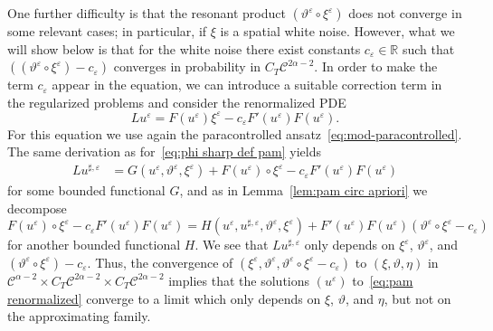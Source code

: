 \documentclass[a4paper,11pt]{article}
\theoremstyle{remark}
\newcommand{\CC}{\ensuremath{\mathscr{C}}}
\newcommand{\reso}{\,\mathord{\circ}\,}
\begin{document}
One further difficulty is that the resonant product $(\vartheta^{\varepsilon} \reso \xi^{\varepsilon} )$ does not converge in some
relevant cases; in particular, if $\xi$ is a spatial white noise. However, what we will show below is that for the white noise  there
exist constants $c_{\varepsilon} \in \mathbb{R}$ such that $((\vartheta^{\varepsilon} \reso \xi^{\varepsilon} ) -c_{\varepsilon})$ converges in probability
in $C_{T} \CC^{2 \alpha -2}$. In order to make the term $c_{\varepsilon}$
appear in the equation, we can introduce a suitable correction term in the
regularized problems and consider the renormalized PDE
\begin{equation}\label{eq:pam renormalized}
   L u^{\varepsilon} =F ( u^{\varepsilon} ) \xi^{\varepsilon} -c_{\varepsilon} F' ( u^{\varepsilon} ) F ( u^{\varepsilon} ) .
\end{equation}
For this equation we use again the paracontrolled ansatz~\eqref{eq:mod-paracontrolled}. The same derivation as for~\eqref{eq:phi sharp def pam} yields
\begin{align*}
   L u^{\sharp, \varepsilon} & = G(u^\varepsilon, \vartheta^\varepsilon, \xi^\varepsilon) + F(u^\varepsilon) \reso \xi^\varepsilon  - c_{\varepsilon} F' ( u^{\varepsilon} ) F ( u^{\varepsilon} )
\end{align*}
for some bounded functional $G$, and as in Lemma~\ref{lem:pam circ apriori} we decompose
\[
   F(u^\varepsilon) \reso \xi^\varepsilon  - c_{\varepsilon} F' ( u^{\varepsilon} ) F ( u^{\varepsilon} ) = H(u^\varepsilon,u^{\sharp,\varepsilon}, \vartheta^\varepsilon,\xi^\varepsilon) + F'(u^\varepsilon) F(u^\varepsilon) (\vartheta^\varepsilon \reso \xi^\varepsilon - c_\varepsilon)
\]
for another bounded functional $H$. 
We see that $Lu^{\sharp , \varepsilon}$ only depends on $\xi^{\varepsilon}$, $\vartheta^{\varepsilon}$, and $(\vartheta^{\varepsilon} \reso \xi^{\varepsilon} ) -c_{\varepsilon}$. Thus,
the convergence of $(\xi^\varepsilon,\vartheta^\varepsilon, \vartheta^{\varepsilon} \reso \xi^{\varepsilon} - c_\varepsilon)$ to $(\xi,\vartheta, \eta)$ in $\CC^{\alpha-2} \times C_{T} \CC^{2 \alpha -2} \times C_T \CC^{2\alpha-2}$ implies that the solutions $( u^{\varepsilon} )$ to~\eqref{eq:pam renormalized} converge to a limit which only depends on $\xi$, $\vartheta$, and $\eta$,
but not on the approximating family.
\end{document}

